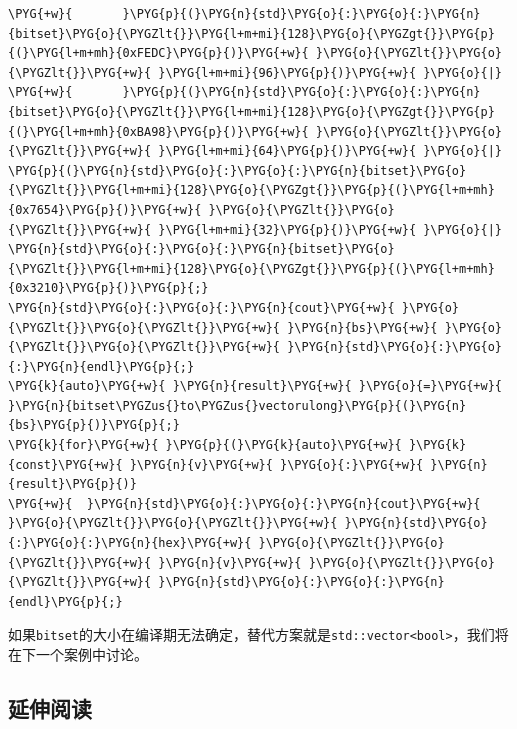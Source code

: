 \begin{itemize}
\begin{codeblockbg}
\begin{Verbatim}[commandchars=\\\{\},breaklines=true,breakanywhere=true,fontsize=\codefont,xleftmargin=17bp]
\PYG{+w}{       }\PYG{p}{(}\PYG{n}{std}\PYG{o}{:}\PYG{o}{:}\PYG{n}{bitset}\PYG{o}{\PYGZlt{}}\PYG{l+m+mi}{128}\PYG{o}{\PYGZgt{}}\PYG{p}{(}\PYG{l+m+mh}{0xFEDC}\PYG{p}{)}\PYG{+w}{ }\PYG{o}{\PYGZlt{}}\PYG{o}{\PYGZlt{}}\PYG{+w}{ }\PYG{l+m+mi}{96}\PYG{p}{)}\PYG{+w}{ }\PYG{o}{|}
\PYG{+w}{       }\PYG{p}{(}\PYG{n}{std}\PYG{o}{:}\PYG{o}{:}\PYG{n}{bitset}\PYG{o}{\PYGZlt{}}\PYG{l+m+mi}{128}\PYG{o}{\PYGZgt{}}\PYG{p}{(}\PYG{l+m+mh}{0xBA98}\PYG{p}{)}\PYG{+w}{ }\PYG{o}{\PYGZlt{}}\PYG{o}{\PYGZlt{}}\PYG{+w}{ }\PYG{l+m+mi}{64}\PYG{p}{)}\PYG{+w}{ }\PYG{o}{|}
\PYG{p}{(}\PYG{n}{std}\PYG{o}{:}\PYG{o}{:}\PYG{n}{bitset}\PYG{o}{\PYGZlt{}}\PYG{l+m+mi}{128}\PYG{o}{\PYGZgt{}}\PYG{p}{(}\PYG{l+m+mh}{0x7654}\PYG{p}{)}\PYG{+w}{ }\PYG{o}{\PYGZlt{}}\PYG{o}{\PYGZlt{}}\PYG{+w}{ }\PYG{l+m+mi}{32}\PYG{p}{)}\PYG{+w}{ }\PYG{o}{|}
\PYG{n}{std}\PYG{o}{:}\PYG{o}{:}\PYG{n}{bitset}\PYG{o}{\PYGZlt{}}\PYG{l+m+mi}{128}\PYG{o}{\PYGZgt{}}\PYG{p}{(}\PYG{l+m+mh}{0x3210}\PYG{p}{)}\PYG{p}{;}
\PYG{n}{std}\PYG{o}{:}\PYG{o}{:}\PYG{n}{cout}\PYG{+w}{ }\PYG{o}{\PYGZlt{}}\PYG{o}{\PYGZlt{}}\PYG{+w}{ }\PYG{n}{bs}\PYG{+w}{ }\PYG{o}{\PYGZlt{}}\PYG{o}{\PYGZlt{}}\PYG{+w}{ }\PYG{n}{std}\PYG{o}{:}\PYG{o}{:}\PYG{n}{endl}\PYG{p}{;}
\PYG{k}{auto}\PYG{+w}{ }\PYG{n}{result}\PYG{+w}{ }\PYG{o}{=}\PYG{+w}{ }\PYG{n}{bitset\PYGZus{}to\PYGZus{}vectorulong}\PYG{p}{(}\PYG{n}{bs}\PYG{p}{)}\PYG{p}{;}
\PYG{k}{for}\PYG{+w}{ }\PYG{p}{(}\PYG{k}{auto}\PYG{+w}{ }\PYG{k}{const}\PYG{+w}{ }\PYG{n}{v}\PYG{+w}{ }\PYG{o}{:}\PYG{+w}{ }\PYG{n}{result}\PYG{p}{)}
\PYG{+w}{  }\PYG{n}{std}\PYG{o}{:}\PYG{o}{:}\PYG{n}{cout}\PYG{+w}{ }\PYG{o}{\PYGZlt{}}\PYG{o}{\PYGZlt{}}\PYG{+w}{ }\PYG{n}{std}\PYG{o}{:}\PYG{o}{:}\PYG{n}{hex}\PYG{+w}{ }\PYG{o}{\PYGZlt{}}\PYG{o}{\PYGZlt{}}\PYG{+w}{ }\PYG{n}{v}\PYG{+w}{ }\PYG{o}{\PYGZlt{}}\PYG{o}{\PYGZlt{}}\PYG{+w}{ }\PYG{n}{std}\PYG{o}{:}\PYG{o}{:}\PYG{n}{endl}\PYG{p}{;}
\end{Verbatim}
\end{codeblockbg}

\end{itemize}



如果\texttt{bitset}的大小在编译期无法确定，替代方案就是\texttt{std::\allowbreak{}vector<\allowbreak{}bool>}，我们将在下一个案例中讨论。



\subsection{延伸阅读}



